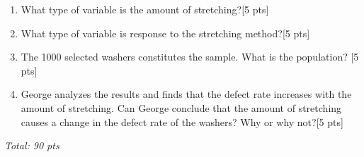 \documentclass[11pt]{article}\usepackage[]{graphicx}\usepackage[]{color}
\begin{document}
\begin{enumerate}
\begin{enumerate}
    \item What type of variable is the amount of stretching?[5 pts] 
     
    \item What type of variable is response to the stretching method?[5 pts]
     
    \item The 1000 selected washers constitutes the sample. What is the population? [5 pts]
    
    \item George analyzes the results and finds that the defect rate increases with the amount of stretching. Can George conclude that the amount of stretching  causes a change in the defect rate of the washers? Why or why not?[5 pts]
    
    \end{enumerate}


\end{enumerate}

\emph{Total: 90 pts}
\end{document}
